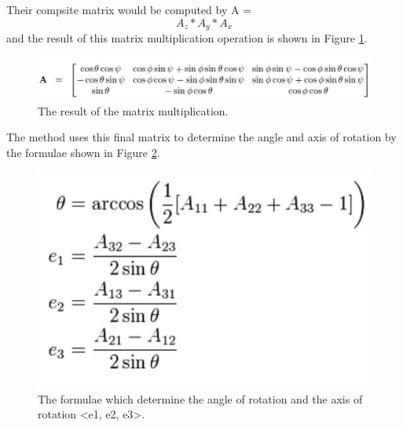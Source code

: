 Their compsite matrix would be computed by A = \[A_z*A_y*A_x\] and the result of this matrix multiplication operation is shown in Figure \ref{fig:bigMatrix}. 
\begin{figure}[H]
\centering
\includegraphics[scale=0.95]{Figures/4_bigMatrix.JPG}
\caption[Composite Rotational Matrix]{The result of the matrix multiplication.}
\label{fig:bigMatrix}
\end{figure}
The method uses this final matrix to determine the angle and axis of rotation by the formulae shown in Figure \ref{fig:angleAxisformulae}. 
\begin{figure}[H]
\centering
\includegraphics[scale=0.85]{Figures/4_angleAxisMatrix.JPG}
\caption[Rotational Angle and Axis Formulae]{The formulae which determine the angle of rotation and the axis of rotation <e1, e2, e3>.}
\label{fig:angleAxisformulae}
\end{figure}




